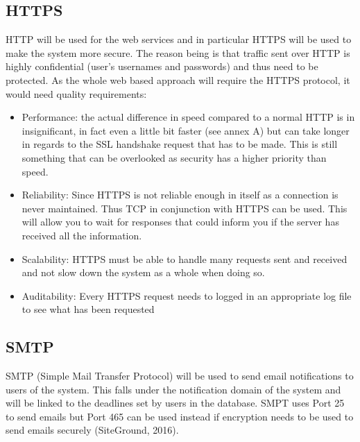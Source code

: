 \documentclass[12pt, letterpaper, twoside]{article}
\begin{document}
    \subsection{HTTPS}
    HTTP will be used for the web services and in particular HTTPS will be used to make the system more secure. The reason being is that traffic sent over HTTP is highly confidential (user’s usernames and passwords) and thus need to be protected. As the whole web based approach will require the HTTPS protocol, it would need quality requirements:
     \begin{itemize}
        \item Performance: the actual difference in speed compared to a normal HTTP is in insignificant, in fact even a little bit   faster (see annex A) but can take longer in regards to the SSL handshake request that has to be made. This is still something that can be overlooked as security has a higher priority than speed.
        \item Reliability: Since HTTPS is not reliable enough in itself as a connection is never maintained. Thus TCP in conjunction with HTTPS can be used. This will allow you to wait for responses that could inform you if the server has received all the information. 
        \item Scalability: HTTPS must be able to handle many requests sent and received and not slow down the system as a whole when doing so.
        \item Auditability: Every HTTPS request needs to  logged in an appropriate log file to see what has been requested
        \end{itemize}
    \endsubsection{}
    \subsection{SMTP}
        SMTP (Simple Mail Transfer Protocol) will be used to send email notifications to users of the system. This falls under the notification domain of the system and will be linked to the deadlines set by users in the database. SMPT uses Port 25 to send emails but Port 465 can be used instead if encryption needs to be used to send emails securely (SiteGround, 2016). 
    \endsubsection{}
\end{document}
